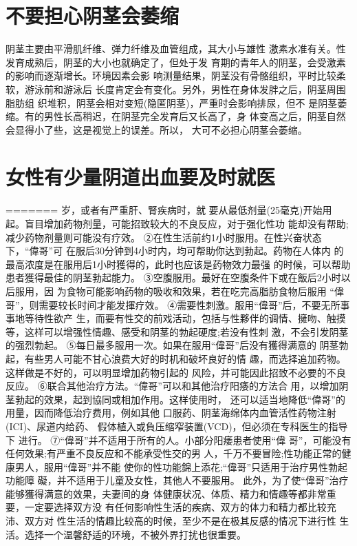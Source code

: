 \documentclass[12pt,UTF8]{ctexbook}
\begin{document}
\section{不要担心阴茎会萎缩}
阴茎主要由平滑肌纤维、弹力纤维及血管组成，其大小与雄性
激素水准有关。性发育成熟后，阴茎的大小也就确定了，但处于发
育期的青年人的阴茎，会受激素的影响而逐渐增长。环境因素会影
响测量结果，阴茎没有骨骼组织，平时比较柔软，游泳前和游泳后
长度肯定会有变化。另外，男性在身体发胖之后，阴茎周围脂肪组
织堆积，阴茎会相对变短(隐匿阴茎)，严重时会影响排尿，但不
是阴茎萎缩。有的男性长高稍迟，在阴茎完全发育后又长高了，身
体变高之后，阴茎自然会显得小了些，这是视觉上的误差。所以，
大可不必担心阴茎会萎缩。

\section{女性有少量阴道出血要及时就医}
=======
岁，或者有严重肝、腎疾病时，就
要从最低剂量(25毫克)开始用
起。盲目增加药物剂量，可能招致较大的不良反应，对于强化性功
能却没有帮助;减少药物剂量则可能没有疗效。
②在性生活前约1小时服用。在性兴奋状态下，“偉哥”可
在服后30分钟到4小时内，均可帮助你达到勃起。药物在人体内
的最高浓度是在服用后1小时獲得的，此时也应该是药物效力最强
的时候，可以帮助患者獲得最佳的阴茎勃起能力。
③空腹服用。最好在空腹条件下或在飯后2小时以后服用，因
为食物可能影响药物的吸收和效果，若在吃完高脂肪食物后服用
“偉哥”，则需要较长时间才能发揮疗效。
④需要性刺激。服用“偉哥”后，不要无所事事地等待性欲产
生，而要有性交的前戏活动，包括与性夥伴的调情、擁吻、触摸
等，这样可以增强性情趣、感受和阴茎的勃起硬度;若没有性刺
激，不会引发阴茎的强烈勃起。
⑤每日最多服用一次。如果在服用“偉哥”后没有獲得满意的
阴茎勃起，有些男人可能不甘心浪费大好的时机和破坏良好的情
趣，而选择追加药物。这样做是不好的，可以明显增加药物引起的
风险，并可能因此招致不必要的不良反应。
⑥联合其他治疗方法。“偉哥”可以和其他治疗阳痿的方法合
用，以增加阴茎勃起的效果，起到協同或相加作用。这样使用时，
还可以适当地降低“偉哥”的用量，因而降低治疗费用，例如其他
口服药、阴茎海绵体内血管活性药物注射(ICI)、尿道内给药、
假体植入或負压缩窄装置(VCD)，但必须在专科医生的指导下
进行。
⑦“偉哥”并不适用于所有的人。小部分阳痿患者使用“偉
哥”，可能没有任何效果;有严重不良反应和不能承受性交的男
人，千万不要冒险;性功能正常的健康男人，服用“偉哥”并不能
使你的性功能錦上添花;“偉哥”只适用于治疗男性勃起功能障
礙，并不适用于儿童及女性，其他人不要服用。
此外，为了使“偉哥”治疗能够獲得满意的效果，夫妻间的身
体健康状况、体质、精力和情趣等都非常重要，一定要选择双方没
有任何影响性生活的疾病、双方的体力和精力都比较充沛、双方对
性生活的情趣比较高的时候，至少不是在极其反感的情况下进行性
生活。选择一个温馨舒适的环境，不被外界打扰也很重要。
\end{document}
